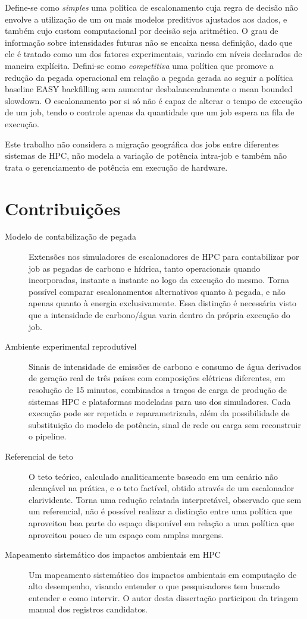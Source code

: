 Define-se como \emph{simples} uma política de escalonamento cuja regra de decisão não envolve a utilização
de um ou mais modelos preditivos ajustados aos dados, e também cujo custom computacional por decisão seja aritmético.
O grau de informação sobre intensidades futuras não se encaixa nessa definição, dado que ele é tratado
como um dos fatores experimentais, variado em níveis declarados de maneira explícita. Defini-se como 
\emph{competitiva} uma política que promove a redução da pegada operacional em relação a pegada gerada
ao seguir a política baseline EASY backfilling sem aumentar desbalanceadamente o mean bounded slowdown.
O escalonamento por si só não é capaz de alterar o tempo de execução de um job, tendo o controle apenas
da quantidade que um job espera na fila de execução.

Este trabalho não considera a migração geográfica dos jobs entre diferentes sistemas de HPC, não modela
a variação de potência intra-job e também não trata o gerenciamento de potência em execução de hardware.

\section{Contribuições}

\begin{description}
    \item[Modelo de contabilização de pegada] Extensões nos simuladores de escalonadores de HPC para
contabilizar por job as pegadas de carbono e hídrica, tanto operacionais quando incorporadas, instante
a instante ao logo da execução do mesmo. Torna possível comparar escalonamentos alternativos quanto
à pegada, e não apenas quanto à energia exclusivamente. Essa distinção é necessária visto que a intensidade
de carbono/água varia dentro da própria execução do job. 
    \item[Ambiente experimental reprodutível] Sinais de intensidade de emissões de carbono e consumo de água
derivados de geração real de três países com composições elétricas diferentes, em resolução de 15 minutos,
combinados a traços de carga de produção de sistemas HPC e plataformas modeladas para uso dos simuladores.
Cada execução pode ser repetida e reparametrizada, além da possibilidade de substituição do modelo de potência,
sinal de rede ou carga sem reconstruir o pipeline.
    \item[Referencial de teto] O teto teórico, calculado analiticamente baseado em um cenário não alcançável na prática,
e o teto factível, obtido através de um escalonador clarividente. Torna uma redução relatada interpretável,
observado que sem um referencial, não é possível realizar a distinção entre uma política que aproveitou
boa parte do espaço disponível em relação a uma política que aproveitou pouco de um espaço com amplas margens.
    \item[Mapeamento sistemático dos impactos ambientais em HPC] Um mapeamento sistemático dos impactos ambientais
em computação de alto desempenho, visando entender o que pesquisadores tem buscado entender e como intervir.
O autor desta dissertação participou da triagem manual dos registros candidatos.
\end{description}